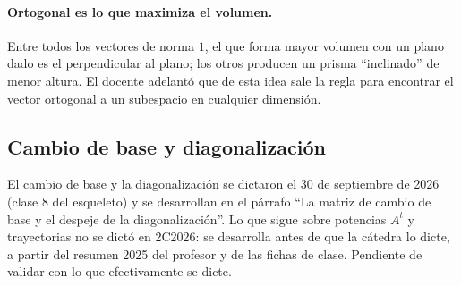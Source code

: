 \paragraph{Ortogonal es lo que maximiza el volumen.} Entre todos los vectores de norma
\(1\), el que forma mayor volumen con un plano dado es el perpendicular al plano; los otros
producen un prisma ``inclinado'' de menor altura. El docente adelantó que de esta idea sale
la regla para encontrar el vector ortogonal a un subespacio en cualquier dimensión.

\subsection{Cambio de base y diagonalización}\label{sec:cambio-base}

{\small\vspace{1mm}\par}
{\small\vspace{1mm}\par}


\begin{atencion}[Anticipado]
El cambio de base y la diagonalización se dictaron el 30 de septiembre de 2026 (clase 8 del
esqueleto) y se desarrollan en el párrafo ``La matriz de cambio de base y el despeje de la
diagonalización''. Lo que sigue sobre potencias \(A^t\) y trayectorias no se dictó en 2C2026: se
desarrolla antes de que la cátedra lo dicte, a partir del resumen 2025 del profesor y de las
fichas de clase. Pendiente de validar con lo que efectivamente se dicte.
\end{atencion}

